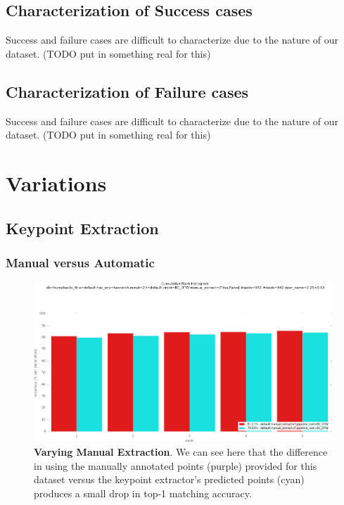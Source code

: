 \subsection{Characterization of Success cases}

Success and failure cases are difficult to characterize due to the nature of our dataset.  (TODO put in something real for this)

\subsection{Characterization of Failure cases}

Success and failure cases are difficult to characterize due to the nature of our dataset.  (TODO put in something real for this)

\section{Variations}

\subsection{Keypoint Extraction}

\subsubsection{Manual versus Automatic}


\begin{figure}[t]%
\centering
\includegraphics[width=1\textwidth]{../images/results/vary_manual_extract.png}
\caption{\textbf{Varying Manual Extraction}. We can see here that the difference in using the manually annotated points (purple) provided for this dataset versus the keypoint extractor's predicted points (cyan) produces a small drop in top-1 matching accuracy.}
\label{fig:vary_manual_extract}
\end{figure}

